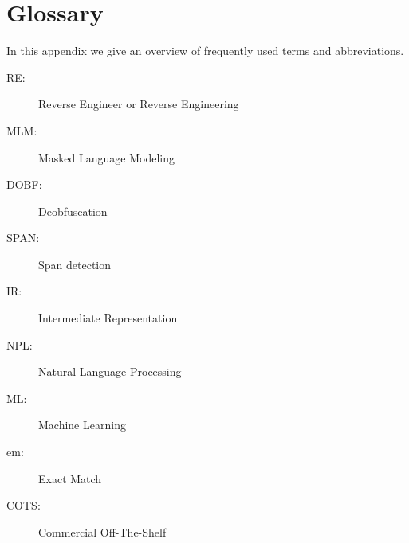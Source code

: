 \chapter{\label{cha:glossary}Glossary}

In this appendix we give an overview of frequently used terms and
abbreviations.

\begin{description}
\item[RE:] Reverse Engineer or Reverse Engineering
\item[MLM:] Masked Language Modeling
\item[DOBF:] Deobfuscation
\item[SPAN:] Span detection
\item[IR:] Intermediate Representation
\item[NPL:] Natural Language Processing
\item[ML:] Machine Learning
\item[em: ] Exact Match
\item[COTS: ] Commercial Off-The-Shelf
\end{description}

